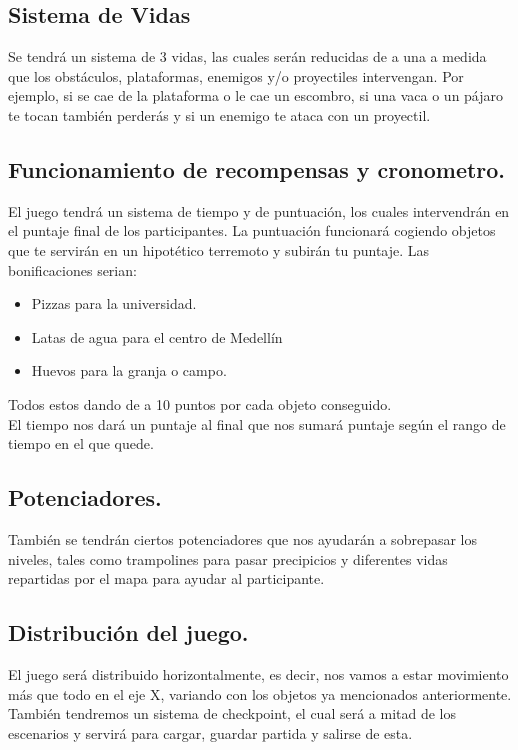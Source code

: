 \documentclass{article}
\begin{document}
\subsection{Sistema de Vidas}
Se tendrá un sistema de 3 vidas, las cuales serán reducidas de a una a medida que los obstáculos, plataformas, enemigos y/o proyectiles intervengan. Por ejemplo, si se cae de la plataforma o le cae un escombro, si una vaca o un pájaro te tocan también perderás y si un enemigo te ataca con un proyectil.

\subsection{Funcionamiento de recompensas y cronometro.}

El juego tendrá un sistema de tiempo y de puntuación, los cuales intervendrán en el puntaje final de los participantes. La puntuación funcionará cogiendo objetos que te servirán en un hipotético terremoto y subirán tu puntaje. Las bonificaciones serian:

\begin{itemize}
    \item Pizzas para la universidad.
    \item Latas de agua para el centro de Medellín
    \item Huevos para la granja o campo.
\end{itemize}

Todos estos dando de a 10 puntos por cada objeto conseguido.\\
El tiempo nos dará un puntaje al final que nos sumará puntaje según el rango de tiempo en el que quede.

\subsection{Potenciadores.}

También se tendrán ciertos potenciadores que nos ayudarán a sobrepasar los niveles, tales como trampolines para pasar precipicios y diferentes vidas repartidas por el mapa para ayudar al participante.

\subsection{Distribución del juego.}
El juego será distribuido horizontalmente, es decir, nos vamos a estar movimiento más que todo en el eje X, variando con los objetos ya mencionados anteriormente. También tendremos un sistema de checkpoint, el cual será a mitad de los escenarios y servirá para cargar, guardar partida y salirse de esta.
\end{document}
